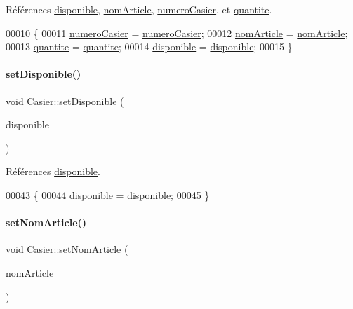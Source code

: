 Références \hyperlink{class_casier_a5bf1314910ade36747faffdd891d94e9}{disponible}, \hyperlink{class_casier_a9632bfa0e94a522bab9da1c3834eaf5a}{nom\+Article}, \hyperlink{class_casier_abc4e6c9bde55c9b703ea53d85b6b1219}{numero\+Casier}, et \hyperlink{class_casier_acf950b0ab2ee437a9dbc8c6b66432b4c}{quantite}.


\begin{DoxyCode}
00010 \{
00011     \hyperlink{class_casier_abc4e6c9bde55c9b703ea53d85b6b1219}{numeroCasier} = \hyperlink{class_casier_abc4e6c9bde55c9b703ea53d85b6b1219}{numeroCasier};
00012     \hyperlink{class_casier_a9632bfa0e94a522bab9da1c3834eaf5a}{nomArticle} = \hyperlink{class_casier_a9632bfa0e94a522bab9da1c3834eaf5a}{nomArticle};
00013     \hyperlink{class_casier_acf950b0ab2ee437a9dbc8c6b66432b4c}{quantite} = \hyperlink{class_casier_acf950b0ab2ee437a9dbc8c6b66432b4c}{quantite};
00014     \hyperlink{class_casier_a5bf1314910ade36747faffdd891d94e9}{disponible} = \hyperlink{class_casier_a5bf1314910ade36747faffdd891d94e9}{disponible};
00015 \}
\end{DoxyCode}
\mbox{\label{class_casier_ac41e3c5e88e638c1375b35940c1870ed}} 
\paragraph{\texorpdfstring{set\+Disponible()}{setDisponible()}}
{\footnotesize\ttfamily void Casier\+::set\+Disponible (\begin{DoxyParamCaption}\item[{int}]{disponible }\end{DoxyParamCaption})}



Références \hyperlink{class_casier_a5bf1314910ade36747faffdd891d94e9}{disponible}.


\begin{DoxyCode}
00043 \{
00044     \hyperlink{class_casier_a5bf1314910ade36747faffdd891d94e9}{disponible} = \hyperlink{class_casier_a5bf1314910ade36747faffdd891d94e9}{disponible};
00045 \}
\end{DoxyCode}
\mbox{\label{class_casier_ab46ac6ac9c4fae70f9b8ef23f856fa52}} 
\paragraph{\texorpdfstring{set\+Nom\+Article()}{setNomArticle()}}
{\footnotesize\ttfamily void Casier\+::set\+Nom\+Article (\begin{DoxyParamCaption}\item[{Q\+String}]{nom\+Article }\end{DoxyParamCaption})}



